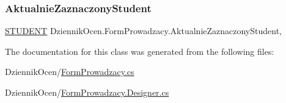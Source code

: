 \mbox{\label{class_dziennik_ocen_1_1_form_prowadzacy_affdca976e8a2ca32c6aef4f70a7996d2}} 
\subsubsection{\texorpdfstring{Aktualnie\+Zaznaczony\+Student}{AktualnieZaznaczonyStudent}}
{\footnotesize\ttfamily \hyperlink{class_dziennik_ocen_1_1_s_t_u_d_e_n_t}{S\+T\+U\+D\+E\+NT} Dziennik\+Ocen.\+Form\+Prowadzacy.\+Aktualnie\+Zaznaczony\+Student\hspace{0.3cm}{\ttfamily [get]}, {\ttfamily [private]}}



The documentation for this class was generated from the following files\+:\begin{DoxyCompactItemize}
\item 
Dziennik\+Ocen/\hyperlink{_form_prowadzacy_8cs}{Form\+Prowadzacy.\+cs}\item 
Dziennik\+Ocen/\hyperlink{_form_prowadzacy_8_designer_8cs}{Form\+Prowadzacy.\+Designer.\+cs}\end{DoxyCompactItemize}
